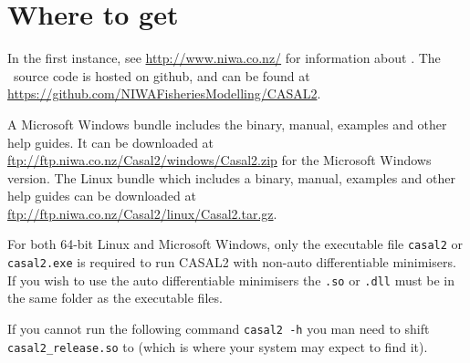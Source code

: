 \section{Where to get \CNAME}\label{sec:installing}

In the first instance, see \url{http://www.niwa.co.nz/} for information about \CNAME . The \CNAME\ source code is hosted on github, and can be found at \url{https://github.com/NIWAFisheriesModelling/CASAL2}.

A Microsoft Windows bundle includes the binary, manual, examples and other help guides. It can be downloaded at \url{ftp://ftp.niwa.co.nz/Casal2/windows/Casal2.zip} for the Microsoft Windows version. The Linux bundle which includes a binary, manual, examples and other help guides can be downloaded at \url{ftp://ftp.niwa.co.nz/Casal2/linux/Casal2.tar.gz}.

For both 64-bit Linux and Microsoft Windows, only the executable file \texttt{casal2} or \texttt{casal2.exe} is required to run CASAL2 with non-auto differentiable minimisers. If you wish to use the auto differentiable minimisers the \texttt{.so} or \texttt{.dll} must be in the same folder as the executable \CNAME files.

If you cannot run the following command \texttt{casal2 -h} you man need to shift \texttt{casal2\_release.so} to  (which is where your system may expect to find it).


